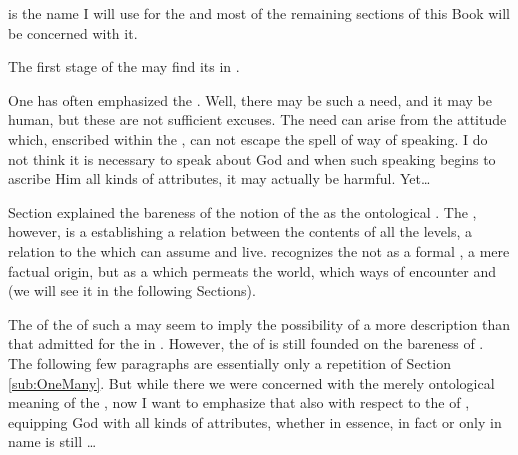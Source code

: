  is the name I will use for the  and most of the remaining sections of this Book will be
concerned with it.


The first stage of the  may find its 
 in .


%
\pa One has often emphasized the . Well, there may be such a need, and it may be human, but these
are not sufficient excuses.  The need can arise from the
 attitude which, enscribed within the \hoa, can not
escape the spell of  way of speaking.  I do not think it
is necessary to speak about God and when such speaking begins to
ascribe Him all kinds of attributes, it may actually be harmful. Yet\ldots


\pa
Section  explained the bareness of the notion of 
the  as the ontological . The 
, however, is a  
establishing a relation 
between the  contents of all the levels, a relation to 
the  which 
 can assume and live. 
 recognizes the  not as a formal , a
mere factual origin, but as a  which permeats the world,
 which   ways of encounter and 
 (we will see it in the following Sections).

The  of the  of such a
 may seem to imply the possibility of a more
 description than that admitted for the  in
.  However, the  of
 is still founded on the bareness of
.  The following few paragraphs are essentially only a
repetition of Section \ref{sub:OneMany}.  But while there we were
concerned with the merely ontological meaning of the , now I
want to emphasize that also with respect to the  of , equipping God with all kinds of attributes,
whether in essence, in fact or only in name is still \ldots

